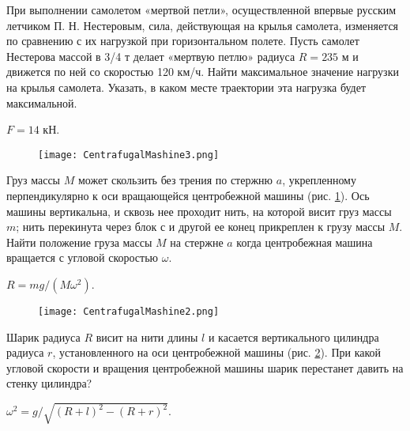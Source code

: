 \begin{ex} %
При выполнении самолетом «мертвой петли», осуществленной впервые русским летчиком П. Н. Нестеровым, сила, действующая на крылья самолета, изменяется по сравнению с их нагрузкой при горизонтальном полете. Пусть самолет Нестерова массой в 3/4 т делает «мертвую петлю» радиуса $R = 235$ м и движется по ней со скоростью 120 км/ч. Найти максимальное значение нагрузки на крылья самолета. Указать, в каком месте траектории эта нагрузка будет максимальной.
\begin{ans}
$F = 14$ кН.
\end{ans}
\end{ex}	

\begin{ex} %

\begin{figure}[h]
\centering
\texttt{[image: CentrafugalMashine3.png]}
\caption{}
\label{CentrafugalMashine3}
\end{figure}

Груз массы $M$ может скользить без трения по стержню $a$, укрепленному перпендикулярно к оси вращающейся центробежной машины (рис. \ref{CentrafugalMashine3}). Ось машины вертикальна, и сквозь нее проходит нить, на которой висит груз массы $m$; нить перекинута через блок с и другой ее конец прикреплен к грузу массы $M$. Найти положение груза массы $M$ на стержне $a$ когда центробежная машина вращается с угловой скоростью $\omega$.
\begin{ans}
$R = mg/(M\omega^2)$.
\end{ans}
\end{ex}	

\complexProblems

\begin{ex}  %

\begin{figure}[h]
\centering
\texttt{[image: CentrafugalMashine2.png]}
\caption{}
\label{CentrafugalMashine2}
\end{figure}

Шарик радиуса $R$ висит на нити длины $l$ и касается вертикального цилиндра радиуса $r$, установленного на оси центробежной машины (рис. \ref{CentrafugalMashine2}). При какой угловой скорости и вращения центробежной машины шарик перестанет давить на стенку цилиндра?

\begin{ans}
$\omega^2 = g/\sqrt{(R+l)^2-(R+r)^2}$.
\end{ans}
\end{ex}	


